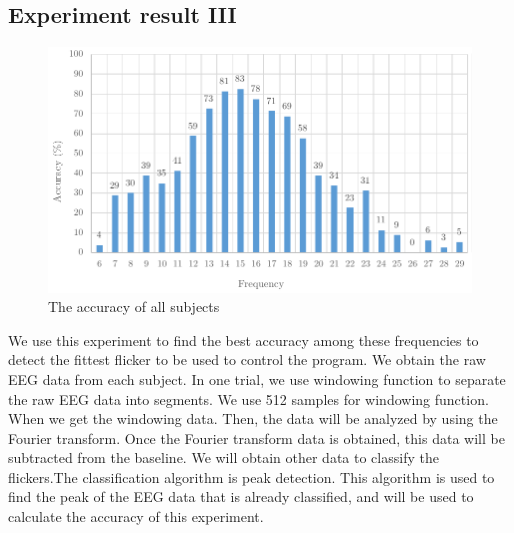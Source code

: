 \newpage
\subsection{Experiment result III}

\begin{figure}[ht]
	\centering
	\includegraphics[scale = 1]{chapter7/exp4.pdf}
	\caption{The accuracy of all subjects}
    \label{fig:avg_exp3}
\end{figure}

We use this experiment to find the best accuracy among these frequencies to detect the fittest flicker to be used to control the program. We obtain the raw EEG data from each subject. In one trial, we use windowing function to separate the raw EEG data into segments. We use 512 samples for windowing function. When we get the windowing data. Then, the data will be analyzed by using the Fourier transform. Once the Fourier transform data is obtained, this data will be subtracted from the baseline. We will obtain other data to classify the flickers.The classification algorithm is peak detection. This algorithm is used to find the peak of the EEG data that is already classified, and will be used to calculate the accuracy of this experiment.


